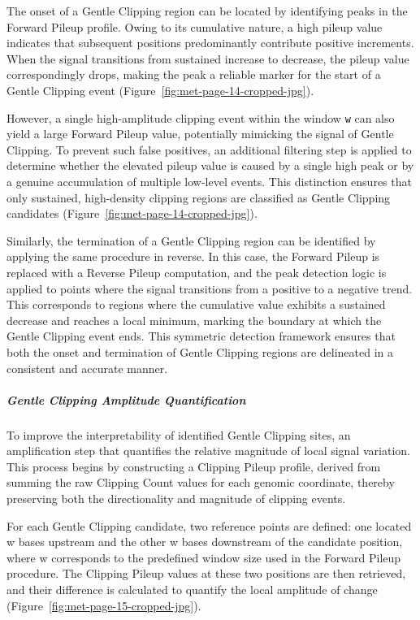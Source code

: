 \documentclass[pdflatex,sn-nature]{sn-jnl}
\begin{document}
The onset of a Gentle Clipping region can be located by identifying peaks in the Forward Pileup profile. Owing to its cumulative nature, a high pileup value indicates that subsequent positions predominantly contribute positive increments. When the signal transitions from sustained increase to decrease, the pileup value correspondingly drops, making the peak a reliable marker for the start of a Gentle Clipping event (Figure~\ref{fig:met-page-14-cropped-jpg}).

However, a single high-amplitude clipping event within the window \texttt{w} can also yield a large Forward Pileup value, potentially mimicking the signal of Gentle Clipping. To prevent such false positives, an additional filtering step is applied to determine whether the elevated pileup value is caused by a single high peak or by a genuine accumulation of multiple low-level events. This distinction ensures that only sustained, high-density clipping regions are classified as Gentle Clipping candidates (Figure~\ref{fig:met-page-14-cropped-jpg}).

Similarly, the termination of a Gentle Clipping region can be identified by applying the same procedure in reverse. In this case, the Forward Pileup is replaced with a Reverse Pileup computation, and the peak detection logic is applied to points where the signal transitions from a positive to a negative trend. This corresponds to regions where the cumulative value exhibits a sustained decrease and reaches a local minimum, marking the boundary at which the Gentle Clipping event ends. This symmetric detection framework ensures that both the onset and termination of Gentle Clipping regions are delineated in a consistent and accurate manner.


\subparagraph{Gentle Clipping Amplitude Quantification}

To improve the interpretability of identified Gentle Clipping sites, an amplification step that quantifies the relative magnitude of local signal variation. This process begins by constructing a Clipping Pileup profile, derived from summing the raw Clipping Count values for each genomic coordinate, thereby preserving both the directionality and magnitude of clipping events.

For each Gentle Clipping candidate, two reference points are defined: one located w bases upstream and the other w bases downstream of the candidate position, where w corresponds to the predefined window size used in the Forward Pileup procedure. The Clipping Pileup values at these two positions are then retrieved, and their difference is calculated to quantify the local amplitude of change (Figure~\ref{fig:met-page-15-cropped-jpg}).
\end{document}
